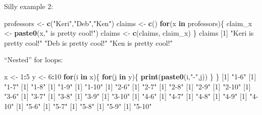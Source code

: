 \documentclass[
]{book}
\newenvironment{Shaded}{\begin{snugshade}}{\end{snugshade}}
\newcommand{\ControlFlowTok}[1]{\textcolor[rgb]{0.13,0.29,0.53}{\textbf{#1}}}
\newcommand{\DecValTok}[1]{\textcolor[rgb]{0.00,0.00,0.81}{#1}}
\newcommand{\KeywordTok}[1]{\textcolor[rgb]{0.13,0.29,0.53}{\textbf{#1}}}
\newcommand{\NormalTok}[1]{#1}
\newcommand{\OperatorTok}[1]{\textcolor[rgb]{0.81,0.36,0.00}{\textbf{#1}}}
\newcommand{\StringTok}[1]{\textcolor[rgb]{0.31,0.60,0.02}{#1}}
\begin{document}
Silly example 2:

\begin{Shaded}
\begin{Highlighting}[]
\NormalTok{professors <-}\StringTok{ }\KeywordTok{c}\NormalTok{(}\StringTok{"Keri"}\NormalTok{,}\StringTok{"Deb"}\NormalTok{,}\StringTok{"Ken"}\NormalTok{) }
\NormalTok{claims <-}\StringTok{ }\KeywordTok{c}\NormalTok{()}
\ControlFlowTok{for}\NormalTok{(x }\ControlFlowTok{in}\NormalTok{ professors)\{}
\NormalTok{  claim_x <-}\StringTok{ }\KeywordTok{paste0}\NormalTok{(x,}\StringTok{" is pretty cool!"}\NormalTok{)}
\NormalTok{  claims <-}\StringTok{ }\KeywordTok{c}\NormalTok{(claims, claim_x)}
\NormalTok{\}}
\NormalTok{claims}
\NormalTok{[}\DecValTok{1}\NormalTok{] }\StringTok{"Keri is pretty cool!"} \StringTok{"Deb is pretty cool!"}  \StringTok{"Ken is pretty cool!"} 
\end{Highlighting}
\end{Shaded}

``Nested'' for loops:

\begin{Shaded}
\begin{Highlighting}[]
\NormalTok{x <-}\StringTok{ }\DecValTok{1}\OperatorTok{:}\DecValTok{5}
\NormalTok{y <-}\StringTok{ }\DecValTok{6}\OperatorTok{:}\DecValTok{10}
\ControlFlowTok{for}\NormalTok{(i }\ControlFlowTok{in}\NormalTok{ x)\{}
  \ControlFlowTok{for}\NormalTok{(j }\ControlFlowTok{in}\NormalTok{ y)\{}
  \KeywordTok{print}\NormalTok{(}\KeywordTok{paste0}\NormalTok{(i,}\StringTok{"-"}\NormalTok{,j))}
\NormalTok{  \}}
\NormalTok{\}}
\NormalTok{[}\DecValTok{1}\NormalTok{] }\StringTok{"1-6"}
\NormalTok{[}\DecValTok{1}\NormalTok{] }\StringTok{"1-7"}
\NormalTok{[}\DecValTok{1}\NormalTok{] }\StringTok{"1-8"}
\NormalTok{[}\DecValTok{1}\NormalTok{] }\StringTok{"1-9"}
\NormalTok{[}\DecValTok{1}\NormalTok{] }\StringTok{"1-10"}
\NormalTok{[}\DecValTok{1}\NormalTok{] }\StringTok{"2-6"}
\NormalTok{[}\DecValTok{1}\NormalTok{] }\StringTok{"2-7"}
\NormalTok{[}\DecValTok{1}\NormalTok{] }\StringTok{"2-8"}
\NormalTok{[}\DecValTok{1}\NormalTok{] }\StringTok{"2-9"}
\NormalTok{[}\DecValTok{1}\NormalTok{] }\StringTok{"2-10"}
\NormalTok{[}\DecValTok{1}\NormalTok{] }\StringTok{"3-6"}
\NormalTok{[}\DecValTok{1}\NormalTok{] }\StringTok{"3-7"}
\NormalTok{[}\DecValTok{1}\NormalTok{] }\StringTok{"3-8"}
\NormalTok{[}\DecValTok{1}\NormalTok{] }\StringTok{"3-9"}
\NormalTok{[}\DecValTok{1}\NormalTok{] }\StringTok{"3-10"}
\NormalTok{[}\DecValTok{1}\NormalTok{] }\StringTok{"4-6"}
\NormalTok{[}\DecValTok{1}\NormalTok{] }\StringTok{"4-7"}
\NormalTok{[}\DecValTok{1}\NormalTok{] }\StringTok{"4-8"}
\NormalTok{[}\DecValTok{1}\NormalTok{] }\StringTok{"4-9"}
\NormalTok{[}\DecValTok{1}\NormalTok{] }\StringTok{"4-10"}
\NormalTok{[}\DecValTok{1}\NormalTok{] }\StringTok{"5-6"}
\NormalTok{[}\DecValTok{1}\NormalTok{] }\StringTok{"5-7"}
\NormalTok{[}\DecValTok{1}\NormalTok{] }\StringTok{"5-8"}
\NormalTok{[}\DecValTok{1}\NormalTok{] }\StringTok{"5-9"}
\NormalTok{[}\DecValTok{1}\NormalTok{] }\StringTok{"5-10"}
\end{Highlighting}
\end{Shaded}
\end{document}
